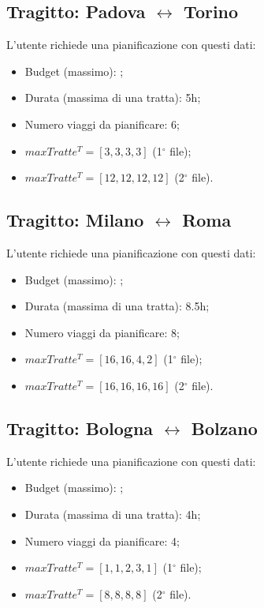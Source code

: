 \documentclass[main.tex]{subfiles}
\begin{document}
\subsection*{Tragitto: Padova $\leftrightarrow$ Torino}
L'utente richiede una pianificazione con questi dati:
\begin{itemize}
    \item Budget (massimo): ;
    \item Durata (massima di una tratta): 5h;
    \item Numero viaggi da pianificare: 6;
    \item $maxTratte^T = [3,3,3,3]$ (1$^{\circ}$ file);
    \item $maxTratte^T = [12,12,12,12]$ (2$^{\circ}$ file).
\end{itemize}

\subsection*{Tragitto: Milano $\leftrightarrow$ Roma}
L'utente richiede una pianificazione con questi dati:
\begin{itemize}
    \item Budget (massimo): ;
    \item Durata (massima di una tratta): 8.5h;
    \item Numero viaggi da pianificare: 8;
    \item $maxTratte^T = [16,16,4,2]$ (1$^{\circ}$ file);
    \item $maxTratte^T = [16,16,16,16]$ (2$^{\circ}$ file).
\end{itemize}

\subsection*{Tragitto: Bologna $\leftrightarrow$ Bolzano}
L'utente richiede una pianificazione con questi dati:
\begin{itemize}
    \item Budget (massimo): ;
    \item Durata (massima di una tratta): 4h;
    \item Numero viaggi da pianificare: 4;
    \item $maxTratte^T = [1,1,2,3,1]$ (1$^{\circ}$ file);
    \item $maxTratte^T = [8,8,8,8]$ (2$^{\circ}$ file).
\end{itemize}
\end{document}
